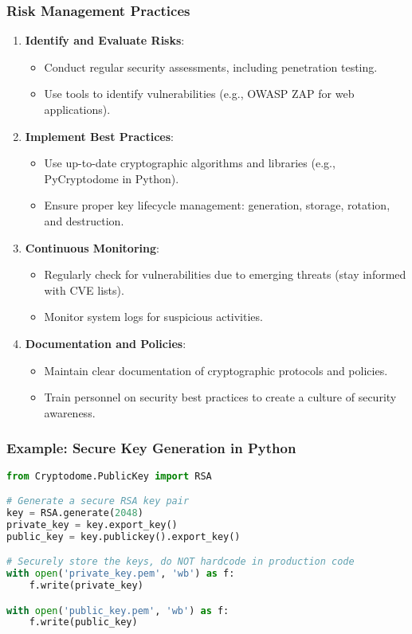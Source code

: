 \documentclass{beamer}
\begin{document}
\begin{frame}
    \frametitle{Risk Management Practices}
    \begin{enumerate}
        \item \textbf{Identify and Evaluate Risks}:
        \begin{itemize}
            \item Conduct regular security assessments, including penetration testing.
            \item Use tools to identify vulnerabilities (e.g., OWASP ZAP for web applications).
        \end{itemize}
        
        \item \textbf{Implement Best Practices}:
        \begin{itemize}
            \item Use up-to-date cryptographic algorithms and libraries (e.g., PyCryptodome in Python).
            \item Ensure proper key lifecycle management: generation, storage, rotation, and destruction.
        \end{itemize}
        
        \item \textbf{Continuous Monitoring}:
        \begin{itemize}
            \item Regularly check for vulnerabilities due to emerging threats (stay informed with CVE lists).
            \item Monitor system logs for suspicious activities.
        \end{itemize}
        
        \item \textbf{Documentation and Policies}:
        \begin{itemize}
            \item Maintain clear documentation of cryptographic protocols and policies.
            \item Train personnel on security best practices to create a culture of security awareness.
        \end{itemize}
    \end{enumerate}
\end{frame}

\begin{frame}[fragile]
    \frametitle{Example: Secure Key Generation in Python}
    \begin{lstlisting}[language=Python]
from Cryptodome.PublicKey import RSA

# Generate a secure RSA key pair
key = RSA.generate(2048)
private_key = key.export_key()
public_key = key.publickey().export_key()

# Securely store the keys, do NOT hardcode in production code
with open('private_key.pem', 'wb') as f:
    f.write(private_key)

with open('public_key.pem', 'wb') as f:
    f.write(public_key)
    \end{lstlisting}
\end{frame}
\end{document}
